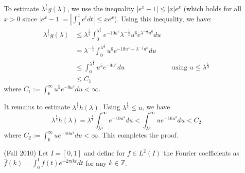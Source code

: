 \documentclass{exam}
\theoremstyle{problemstyle}
\newcommand{\1}[1]{\textbf{1}_{\left[#1\right]}} %
\def\Z{\mathbb{Z}} %
\begin{document}
\begin{questions}
\begin{solution}
  To estimate $\lambda^{\frac{1}{4}}g(\lambda)$, we use the inequality $|e^{x}-1|\leq |x|e^{x}$  (which holds for all $x>0$ since $|e^{x}-1|=|\int_{0}^{x}e^{t}dt|\leq xe^{x}$). Using this inequality, we have:
   \begin{align*}
     \lambda^{\frac{1}{4}}g(\lambda)
     &\leq \lambda^{\frac{1}{4}}\int_{0}^{\lambda^{\frac{1}{4}}} e^{-10u^{4}}\lambda^{-\frac{1}{2}}u^{6}e^{\lambda^{-\frac{1}{2}}u^{6}}du\\
     &=\lambda^{-\frac{1}{4}}\int_{0}^{\lambda^{\frac{1}{4}}} u^{6}e^{-10u^{4}+\lambda^{-\frac{1}{2}}u^{6}}du\\
     &\leq \int_{0}^{\lambda^{\frac{1}{4}}} u^{5}e^{-9u^{4}}du &&\text{using }u\leq \lambda^{\frac{1}{4}}\\
     &\leq  C_{1}
   \end{align*}
   where $C_{1} := \int_{0}^{\infty} u^{5}e^{-9u^{4}}du<\infty$.
   
   It remains to estimate $\lambda^{\frac{1}{4}}h(\lambda)$. Using $\lambda^{\frac{1}{4}}\leq u$, we have
   \begin{equation*}
     \lambda^{\frac{1}{4}}h(\lambda)
      = \lambda^{\frac{1}{4}}\int_{\lambda^{\frac{1}{4}}}^{\infty}e^{-10u^{4}}du
     < \int_{\lambda^{\frac{1}{4}}}^{\infty}ue^{-10 u^{4}}du < C_{2}
   \end{equation*}
   where $C_{2} := \int_{0}^{\infty}ue^{-10u^{4}}du<\infty$. This completes the proof.
 \end{solution}

\question (Fall 2010)
Let $I = [0,1]$ and define for $f\in L^{2}(I)$ the Fourier coefficients as $\hat{f}(k) =\int_{0}^{1}f(t)e^{-2\pi i k t}dt$ for any $k\in \Z$. 


\end{questions}
\end{document}
